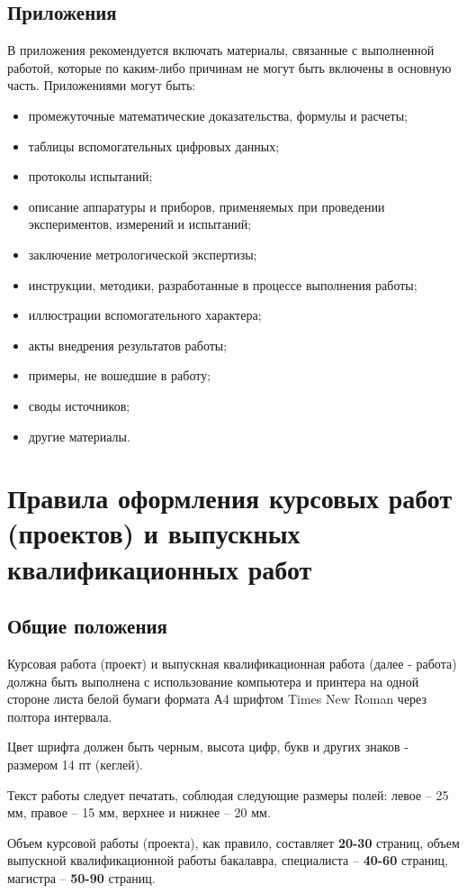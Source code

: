 \documentclass[14pt]{extreport}
\begin{document}
\section{Приложения}
В приложения рекомендуется включать материалы, связанные с выполненной
работой, которые по каким-либо причинам не могут быть включены в основную часть.
Приложениями могут быть:
\begin{itemize}
\item промежуточные математические доказательства, формулы и расчеты;
\item таблицы вспомогательных цифровых данных;
\item протоколы испытаний;
\item описание аппаратуры и приборов, применяемых при проведении экспериментов,
измерений и испытаний;
\item заключение метрологической экспертизы;
\item инструкции, методики, разработанные в процессе выполнения работы;
\item иллюстрации вспомогательного характера;
\item акты внедрения результатов работы;
\item примеры, не вошедшие в работу;
\item своды источников;
\item другие материалы.
\end{itemize}


\chapter{Правила оформления курсовых работ (проектов) и выпускных квалификационных
работ}

\section{Общие положения}
Курсовая работа (проект) и выпускная квалификационная работа (далее -
работа) должна быть выполнена с использование компьютера и принтера на одной
стороне листа белой бумаги формата А4 шрифтом Times New Roman через полтора
интервала. 

Цвет шрифта должен быть черным, высота цифр, букв и других знаков - размером 14
пт (кеглей).

Текст работы следует печатать, соблюдая следующие размеры полей: левое – 25 мм,
правое – 15 мм, верхнее и нижнее – 20 мм.

Объем курсовой работы (проекта), как правило, составляет \textbf{20-30} страниц, объем
выпускной квалификационной работы бакалавра, специалиста –  \textbf{40-60} страниц,
магистра – \textbf{50-90} страниц.
\end{document}
